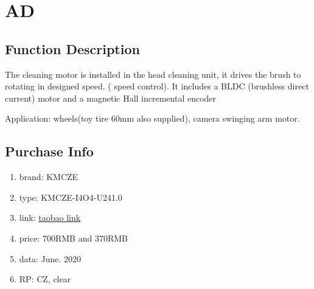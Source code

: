 \setchapterpreamble[u]{\margintoc}
\chapter{A\/D}

\section{Function Description}
The cleaning motor is installed in the head cleaning unit, it drives the brush to rotating in designed speed.
({\color{red} speed control}).
It includes a BLDC (brushless direct current) motor and a magnetic Hall incremental encoder 


Application: wheels(toy tire 60mm also supplied), camera swinging arm motor.

	

\section{Purchase Info}
\begin{enumerate}
	\item brand: KMCZE
	\item type: KMCZE-I4O4-U241.0
	\item link: \href{https://item.taobao.com/item.htm?id=559200622128}{taobao link} 
	\item price: 700RMB and 370RMB
	\item data: June. 2020
	\item RP: CZ, clear
\end{enumerate}

